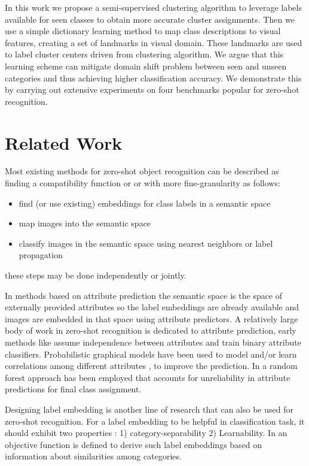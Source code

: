 \documentclass[wcp]{jmlr}
\begin{document}
 In this work
 we propose a
  semi-supervised clustering algorithm to leverage labels available for seen classes to obtain more accurate cluster assignments.
 Then we use a simple dictionary learning method to map class descriptions to visual features, creating a set of landmarks in
 visual domain. These landmarks are used to label cluster centers driven from clustering algorithm. We argue that this learning
 scheme can mitigate domain shift problem \cite{eccv14} between seen and unseen categories and thus achieving higher classification accuracy.
We demonstrate this by carrying out extensive experiments on four benchmarks popular for zero-shot recognition.



\section{Related Work}
Most existing methods for zero-shot object recognition can be described as finding a compatibility function or
or with more fine-granularity as follows:
\begin{itemize}
  \item find (or use existing) embeddings for class labels in a semantic space
  \item map images into the semantic space
  \item classify images in the semantic space using nearest neighbors or label propagation
\end{itemize}
these steps may be done independently or jointly.

In methods based on attribute prediction \cite{ziad} the semantic space is the space of externally provided attributes so the label embeddings are
already available and images are embedded in that space using attribute predictors. A relatively large body of work in zero-shot recognition is
dedicated to attribute prediction, early methods like \cite{lamp} assume independence between attributes and train binary attribute classifiers.
Probabilistic graphical models have been used to model and/or learn correlations among different attributes \cite{}, to improve the prediction.
In \cite{jayaraman14}  a random forest approach has been employed that accounts for unreliability in attribute predictions for final class assignment.

Designing label embedding is another line of research that can also be used for zero-shot recognition. For a label embedding to be helpful in classification task,
it should exhibit two properties \cite{Yu2013}: 1) category-separability 2) Learnability. In \cite{Yu2013} an objective function is defined to derive
such label embeddings based on information about similarities among categories.
\end{document}
